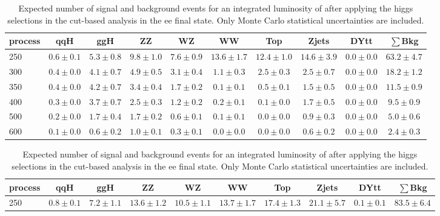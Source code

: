 \begin{table}
{\footnotesize
 \begin{center}
 \begin{tabular}{l | c c | c c c c c c c }
 \hline
 process & qqH & ggH & ZZ & WZ & WW & Top & Zjets & DYtt & $\sum$Bkg \\
 \hline
250 & $0.6\pm0.1$ & $5.3\pm0.8$ & $9.8\pm1.0$ & $7.6\pm0.9$ & $13.6\pm1.7$ & $12.4\pm1.0$ & $14.6\pm3.9$ & $0.0\pm0.0$ & $63.2\pm4.7$ \\ %
300 & $0.4\pm0.0$ & $4.1\pm0.7$ & $4.9\pm0.5$ & $3.1\pm0.4$ & $1.1\pm0.3$ & $2.5\pm0.3$ & $2.5\pm0.7$ & $0.0\pm0.0$ & $18.2\pm1.2$ \\ %
350 & $0.4\pm0.0$ & $4.2\pm0.7$ & $3.4\pm0.4$ & $1.7\pm0.2$ & $0.1\pm0.1$ & $0.5\pm0.1$ & $1.5\pm0.5$ & $0.0\pm0.0$ & $11.5\pm0.9$ \\ %
400 & $0.3\pm0.0$ & $3.7\pm0.7$ & $2.5\pm0.3$ & $1.2\pm0.2$ & $0.2\pm0.1$ & $0.1\pm0.0$ & $1.7\pm0.5$ & $0.0\pm0.0$ & $9.5\pm0.9$ \\ %
500 & $0.2\pm0.0$ & $1.7\pm0.4$ & $1.7\pm0.2$ & $0.6\pm0.1$ & $0.1\pm0.1$ & $0.0\pm0.0$ & $0.9\pm0.3$ & $0.0\pm0.0$ & $5.0\pm0.6$ \\ %
600 & $0.1\pm0.0$ & $0.6\pm0.2$ & $1.0\pm0.1$ & $0.3\pm0.1$ & $0.0\pm0.0$ & $0.0\pm0.0$ & $0.6\pm0.2$ & $0.0\pm0.0$ & $2.4\pm0.3$ \\ %
\hline
\end{tabular}
\end{center}
\label{tab:yield_cutbased_ee}
}
\caption{Expected number of signal and background events for an 
  integrated luminosity of \intlumi after applying the higgs selections in the cut-based analysis in the ee final state. 
  Only Monte Carlo statistical uncertainties are included. }
{\footnotesize
 \begin{center}
 \begin{tabular}{l | c c |  c c c c c c c }
 \hline
 process & qqH & ggH & ZZ & WZ & WW & Top & Zjets & DYtt & $\sum$Bkg \\
 \hline
250 & $0.8\pm0.1$ & $7.2\pm1.1$ & $13.6\pm1.2$ & $10.5\pm1.1$ & $13.7\pm1.7$ & $17.4\pm1.3$ & $21.1\pm5.7$ & $0.1\pm0.1$ & $83.5\pm6.4$  \\ %

\end{tabular}
\end{center}}
\end{table}
